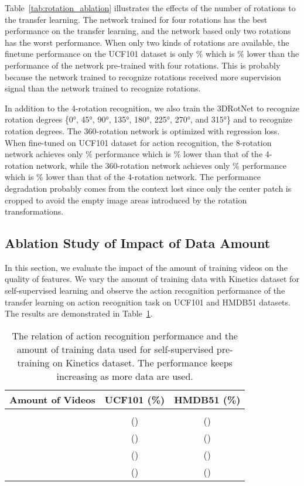 \documentclass[10pt,twocolumn,letterpaper]{article}
\begin{document}
Table~\ref{tab:rotation_ablation} illustrates the effects of the number of rotations to the transfer learning. The network trained for four rotations has the best performance on the transfer learning, and the network based  only two rotations has the worst performance. When only two kinds of rotations are available, the finetune performance on the UCF101 dataset is only \% which is \% lower than the performance of the network pre-trained with four rotations. This is probably because the network trained to recognize  rotations received more supervision signal than the network trained to recognize  rotations.

In addition to the 4-rotation recognition, we also train the 3DRotNet to recognize  rotation degrees \{\ang{0}, \ang{45}, \ang{90}, \ang{135}, \ang{180}, \ang{225}, \ang{270}, and \ang{315}\} and to recognize  rotation degrees. The 360-rotation network is optimized with regression loss. When fine-tuned on UCF101 dataset for action recognition, the 8-rotation network achieves only \% performance which is \% lower than that of the 4-rotation network, while the 360-rotation network achieves only \% performance which is \% lower than that of the 4-rotation network. The performance degradation probably comes from the context lost since only the center patch is cropped to avoid the empty image areas introduced by the rotation transformations.

\subsection{Ablation Study of Impact of Data Amount}

In this section, we evaluate the impact of the amount of training videos on the quality of features. We vary the amount of training data with Kinetics dataset for self-supervised learning and observe the action recognition performance of the transfer learning on action recognition task on UCF101 and HMDB51 datasets. The results are demonstrated in Table~\ref{tab:amount_ablation}.

\begin{table}[hb]
\begin{center}
\begin{tabular}{l|c|c}
\hline
Amount of Videos  & UCF101 (\%)  & HMDB51 (\%)\\
\hline\hline
        &     &\\
  & ()     & ()\\
  & ()     & ()\\
  & ()     & ()\\
       & ()     & ()\\
\hline
\end{tabular}
\end{center}
\caption{The relation of action recognition performance and the amount of training data used for self-supervised pre-training on Kinetics dataset. The performance keeps increasing as more data are used.}
\label{tab:amount_ablation}
\end{table}
\end{document}
